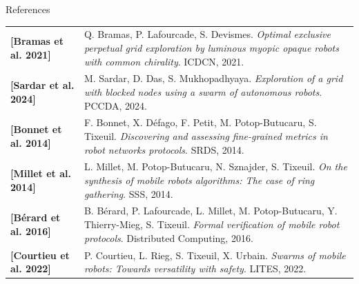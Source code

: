 \begin{frame}{References}
\begin{center}
  \vspace{-0.2cm}
  {\footnotesize
  \begin{tabular}{@{}lp{}@{}}
    \textbf{[Bramas et al. 2021]} & Q. Bramas, P. Lafourcade, S. Devismes. \textit{Optimal exclusive perpetual grid exploration by luminous myopic opaque robots with common chirality}. ICDCN, 2021. \\
    \textbf{[Sardar et al. 2024]} & M. Sardar, D. Das, S. Mukhopadhyaya. \textit{Exploration of a grid with blocked nodes using a swarm of autonomous robots}. PCCDA, 2024. \\
    \textbf{[Bonnet et al. 2014]} & F. Bonnet, X. Défago, F. Petit, M. Potop-Butucaru, S. Tixeuil. \textit{Discovering and assessing fine-grained metrics in robot networks protocols}. SRDS, 2014. \\
    \textbf{[Millet et al. 2014]} & L. Millet, M. Potop-Butucaru, N. Sznajder, S. Tixeuil. \textit{On the synthesis of mobile robots algorithms: The case of ring gathering}. SSS, 2014. \\
    \textbf{[Bérard et al. 2016]} & B. Bérard, P. Lafourcade, L. Millet, M. Potop-Butucaru, Y. Thierry-Mieg, S. Tixeuil. \textit{Formal verification of mobile robot protocols}. Distributed Computing, 2016. \\
    \textbf{[Courtieu et al. 2022]} & P. Courtieu, L. Rieg, S. Tixeuil, X. Urbain. \textit{Swarms of mobile robots: Towards versatility with safety}. LITES, 2022.
  \end{tabular}
  }
\end{center}
\end{frame}
